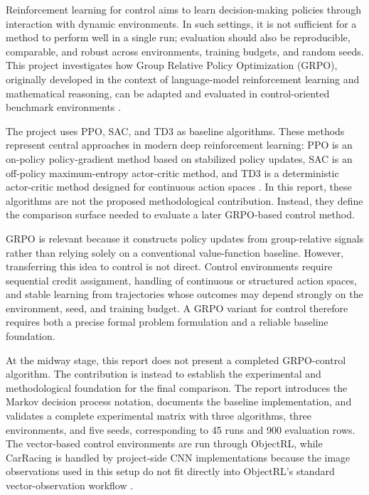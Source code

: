 
Reinforcement learning for control aims to learn decision-making policies through interaction with dynamic environments. In such settings, it is not sufficient for a method to perform well in a single run; evaluation should also be reproducible, comparable, and robust across environments, training budgets, and random seeds. This project investigates how Group Relative Policy Optimization (GRPO), originally developed in the context of language-model reinforcement learning and mathematical reasoning, can be adapted and evaluated in control-oriented benchmark environments \citep{shao2024deepseekmath}.

The project uses PPO, SAC, and TD3 as baseline algorithms. These methods represent central approaches in modern deep reinforcement learning: PPO is an on-policy policy-gradient method based on stabilized policy updates, SAC is an off-policy maximum-entropy actor-critic method, and TD3 is a deterministic actor-critic method designed for continuous action spaces \citep{schulman2017proximal,haarnoja2018sacapps,fujimoto2018td3}. In this report, these algorithms are not the proposed methodological contribution. Instead, they define the comparison surface needed to evaluate a later GRPO-based control method.

GRPO is relevant because it constructs policy updates from group-relative signals rather than relying solely on a conventional value-function baseline. However, transferring this idea to control is not direct. Control environments require sequential credit assignment, handling of continuous or structured action spaces, and stable learning from trajectories whose outcomes may depend strongly on the environment, seed, and training budget. A GRPO variant for control therefore requires both a precise formal problem formulation and a reliable baseline foundation.

At the midway stage, this report does not present a completed GRPO-control algorithm. The contribution is instead to establish the experimental and methodological foundation for the final comparison. The report introduces the Markov decision process notation, documents the baseline implementation, and validates a complete experimental matrix with three algorithms, three environments, and five seeds, corresponding to 45 runs and 900 evaluation rows. The vector-based control environments are run through ObjectRL, while CarRacing is handled by project-side CNN implementations because the image observations used in this setup do not fit directly into ObjectRL's standard vector-observation workflow \citep{baykal2025objectrl,towers2024gymnasium}.

